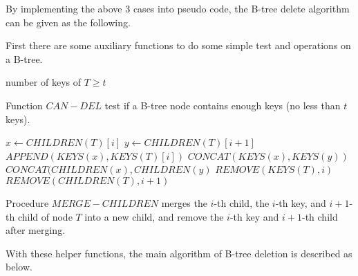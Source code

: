 \documentclass{article}
\begin{document}
By implementing the above 3 cases into pseudo code, the B-tree delete algorithm
can be given as the following.

First there are some auxiliary functions to do some simple test and operations
on a B-tree.

\begin{algorithmic}[1]
  \State \Return number of keys of  $T \ge t$
\EndFunction
\end{algorithmic}

Function $CAN-DEL$ test if a B-tree node contains enough keys (no less than
$t$ keys).

\begin{algorithmic}[1]
 
  \State $x \leftarrow CHILDREN(T)[i]$
  \State $y \leftarrow CHILDREN(T)[i+1]$
  \State $APPEND(KEYS(x), KEYS(T)[i])$
  \State $CONCAT(KEYS(x), KEYS(y))$
  \State $CONCAT(CHILDREN(x), CHILDREN(y)$
  \State $REMOVE(KEYS(T), i)$
  \State $REMOVE(CHILDREN(T), i+1)$
\EndProcedure
\end{algorithmic}

Procedure $MERGE-CHILDREN$ merges the $i$-th child, the $i$-th key, 
and $i+1$-th child of node $T$ into a new child, and remove the 
$i$-th key and $i+1$-th child after merging.

With these helper functions, the main algorithm of B-tree deletion is described
as below.
\end{document}
